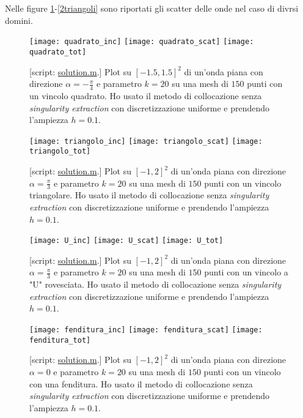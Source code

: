 Nelle figure \ref{quadrato}-\ref{2triangoli} sono riportati gli scatter delle onde nel caso di divrsi domini.

\begin{figure}[h!]
	\centering
	\texttt{[image: quadrato\_inc]}
	\texttt{[image: quadrato\_scat]}
	\texttt{[image: quadrato\_tot]}
	\caption{[script: \href{https://github.com/Daldossi/BEM/blob/main/solution.m}{solution.m}.] Plot su $[-1.5,1.5]^2$ di un'onda piana con direzione $\alpha=-\frac{\pi}{4}$ e parametro $k=20$ su una mesh di $150$ punti con un vincolo quadrato. Ho usato il metodo di collocazione senza \textit{singularity extraction} con discretizzazione uniforme e prendendo l'ampiezza $h=0.1$.}
	\label{quadrato}
\end{figure}
\begin{figure}
	\centering
	\texttt{[image: triangolo\_inc]}
	\texttt{[image: triangolo\_scat]}
	\texttt{[image: triangolo\_tot]}
	\caption{[script: \href{https://github.com/Daldossi/BEM/blob/main/solution.m}{solution.m}.] Plot su $[-1,2]^2$ di un'onda piana con direzione $\alpha=\frac{\pi}{3}$ e parametro $k=20$ su una mesh di $150$ punti con un vincolo triangolare. Ho usato il metodo di collocazione senza \textit{singularity extraction} con discretizzazione uniforme e prendendo l'ampiezza $h=0.1$.}
	\label{triangolo}
\end{figure}
\begin{figure}
	\centering
	\texttt{[image: U\_inc]}
	\texttt{[image: U\_scat]}
	\texttt{[image: U\_tot]}
	\caption{[script: \href{https://github.com/Daldossi/BEM/blob/main/solution.m}{solution.m}.] Plot su $[-1,2]^2$ di un'onda piana con direzione $\alpha=\frac{\pi}{3}$ e parametro $k=20$ su una mesh di $150$ punti con un vincolo a "U" rovesciata. Ho usato il metodo di collocazione senza \textit{singularity extraction} con discretizzazione uniforme e prendendo l'ampiezza $h=0.1$.}
	\label{U}
\end{figure}
\begin{figure}
	\centering
	\texttt{[image: fenditura\_inc]}
	\texttt{[image: fenditura\_scat]}
	\texttt{[image: fenditura\_tot]}
	\caption{[script: \href{https://github.com/Daldossi/BEM/blob/main/solution.m}{solution.m}.] Plot su $[-1,2]^2$ di un'onda piana con direzione $\alpha=0$ e parametro $k=20$ su una mesh di $150$ punti con un vincolo con una fenditura. Ho usato il metodo di collocazione senza \textit{singularity extraction} con discretizzazione uniforme e prendendo l'ampiezza $h=0.1$.}
	\label{fenditura}
\end{figure}
